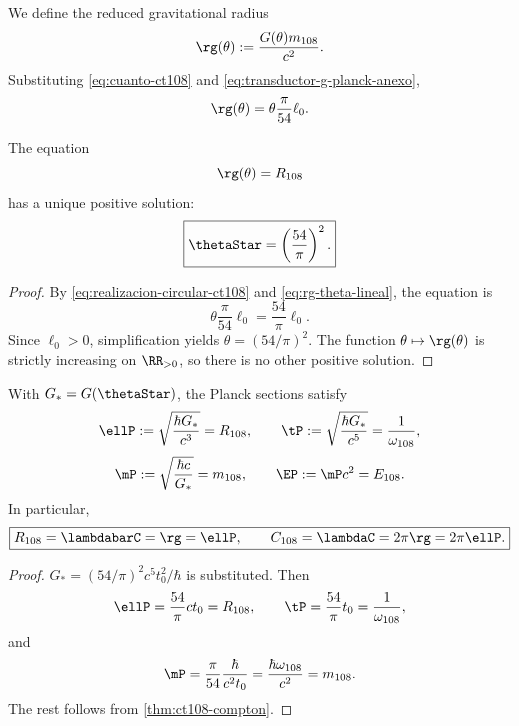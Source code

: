 We define the reduced gravitational radius
\begin{equation}
\rg(\theta):=\frac{G(\theta)m_{108}}{c^2}.
\label{eq:radio-gravitatorio-reducido}
\end{equation}
Substituting \eqref{eq:cuanto-ct108} and
\eqref{eq:transductor-g-planck-anexo},
\begin{equation}
\rg(\theta)
=\theta\frac{\pi}{54}\ell_0.
\label{eq:rg-theta-lineal}
\end{equation}

\begin{theorem}
\label{thm:selector-autodual-ct108}
The equation
\[
\rg(\theta)=R_{108}
\]
has a unique positive solution:
\begin{equation}
\boxed{\thetaStar=\left(\frac{54}{\pi}\right)^2.}
\label{eq:theta-star}
\end{equation}
\end{theorem}

\begin{proof}
By \eqref{eq:realizacion-circular-ct108} and
\eqref{eq:rg-theta-lineal}, the equation is
\[
\theta\frac{\pi}{54}\ell_0
=\frac{54}{\pi}\ell_0.
\]
Since \(\ell_0>0\), simplification yields
\(\theta=(54/\pi)^2\). The function
\(\theta\mapsto\rg(\theta)\) is strictly increasing on
\(\RR_{>0}\), so there is no other positive solution.
\end{proof}

\begin{corollary}
\label{cor:unidad-planck-interna}
With \(G_*=G(\thetaStar)\), the Planck sections satisfy
\begin{equation}
\ellP:=\sqrt{\frac{\hbar G_*}{c^3}}=R_{108},
\qquad
\tP:=\sqrt{\frac{\hbar G_*}{c^5}}=\frac1{\omega_{108}},
\label{eq:planck-long-time-ct108}
\end{equation}
\begin{equation}
\mP:=\sqrt{\frac{\hbar c}{G_*}}=m_{108},
\qquad
\EP:=\mP c^2=E_{108}.
\label{eq:planck-mass-energy-ct108}
\end{equation}
In particular,
\begin{equation}
\boxed{
R_{108}=\lambdabarC=\rg=\ellP,
\qquad
C_{108}=\lambdaC=2\pi\rg=2\pi\ellP.}
\label{eq:tres-lectores-planck}
\end{equation}
\end{corollary}

\begin{proof}
\(G_*=(54/\pi)^2c^5t_0^2/\hbar\) is substituted. Then
\[
\ellP=\frac{54}{\pi}ct_0=R_{108},
\qquad
\tP=\frac{54}{\pi}t_0=\frac1{\omega_{108}},
\]
and
\[
\mP=\frac{\pi}{54}\frac{\hbar}{c^2t_0}
=\frac{\hbar\omega_{108}}{c^2}=m_{108}.
\]
The rest follows from \cref{thm:ct108-compton}.
\end{proof}

